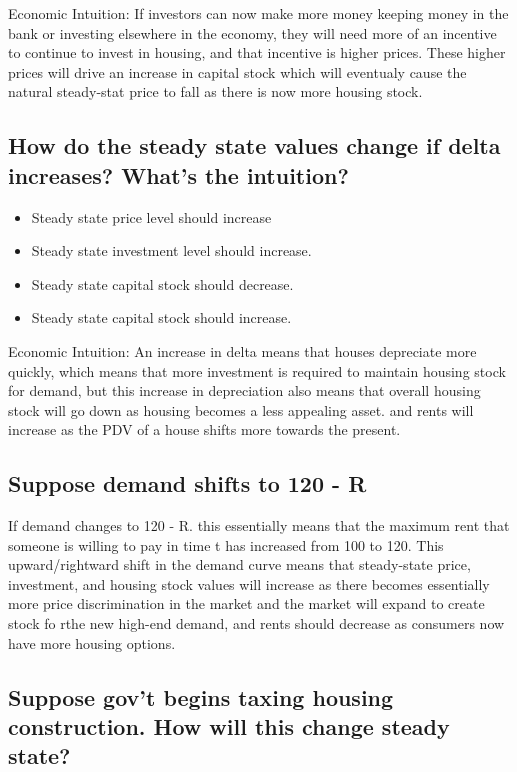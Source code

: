 \documentclass{article}\usepackage[]{graphicx}\usepackage[]{color}
\begin{document}
Economic Intuition: If investors can now make more money keeping money in the bank or investing elsewhere in the economy, they will need more of an incentive to continue to invest in housing, and that incentive is higher prices. These higher prices will drive an increase in capital stock which will eventualy cause the natural steady-stat price to fall as there is now more housing stock.

\subsection{How do the steady state values change if delta increases? What's the intuition?}
\begin{itemize}
  \item Steady state price level should increase\\
  \item Steady state investment level should increase. \\
  \item Steady state capital stock should decrease. \\
  \item Steady state capital stock should increase. \\
\end{itemize}

Economic Intuition: An increase in delta means that houses depreciate more quickly, which means that more investment is required to maintain housing stock for demand, but this increase in depreciation also means that overall housing stock will go down as housing becomes a less appealing asset. and rents will increase as the PDV of a house shifts more towards the present.

\subsection{Suppose demand shifts to 120 - R}

If demand changes to 120 - R. this essentially means that the maximum rent that someone is willing to pay in time t has increased from 100 to 120. This upward/rightward shift in the demand curve means that steady-state price, investment, and housing stock values will increase as there becomes essentially more price discrimination in the market and the market will expand to create stock fo rthe new high-end demand, and rents should decrease as consumers now have more housing options. 

\subsection{Suppose gov't begins taxing housing construction. How will this change steady state?}
\end{document}

